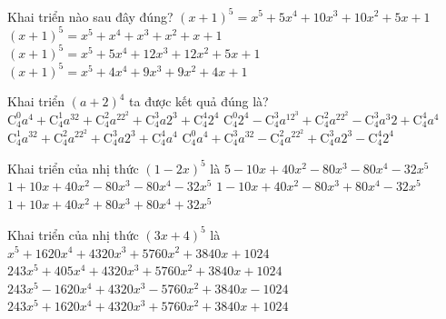 \begin{ex}%
	Khai triển nào sau đây  đúng?
	\choice 
		 {\True $(x+1)^5=x^5+5x^4+10x^3+10x^2+5x+1$}
		{$(x+1)^5=x^5+x^4+x^3+x^2+x+1$} 
		{$(x+1)^5=x^5+5x^4+12x^3+12x^2+5x+1$} 
		 {$(x+1)^5=x^5+4x^4+9x^3+9x^2+4x+1$}
\end{ex}

\begin{ex}%
	Khai triển $(a + 2)^4$ ta  được kết quả đúng là?
	 \choice
		{\True $\mathrm{C}_{4}^{0}a^4 + \mathrm{C}_{4}^{1}a^32 + \mathrm{C}_{4}^{2}a^22^2 + \mathrm{C}_{4}^{3}a 2^3 +  \mathrm{C}_{4}^{4}2^4$}
		{$\mathrm{C}_{4}^{0}2^4  - \mathrm{C}_{4}^{3}a^12^3 + \mathrm{C}_{4}^{2}a^22^2 - \mathrm{C}_{4}^{3}a^3 2 + \mathrm{C}_{4}^{4}a^4$}
		 {$\mathrm{C}_{4}^{1}a^32 + \mathrm{C}_{4}^{2}a^22^2 + \mathrm{C}_{4}^{3}a2^3 + \mathrm{C}_{4}^{4}a^4$}
		{$\mathrm{C}_{4}^{0}a^4 +  \mathrm{C}_{4}^{3}a^32 - \mathrm{C}_{4}^{2}a^22^2 + \mathrm{C}_{4}^{3}a 2^3 - \mathrm{C}_{4}^{4}2^4$}
\end{ex}

\begin{ex}%
	Khai triển của nhị thức $(1-2x)^5$ là 
	\choice 
		 {$5-10x+40x^2-80x^3-80x^4-32x^5$}
		 {$1+10x+40x^2-80x^3-80x^4-32x^5$}
		{\True  $1-10x+40x^2-80x^3+80x^4-32x^5$}
		 {$1+10x+40x^2+80x^3+80x^4+32x^5$}
\end{ex}

\begin{ex}%
	Khai triển của nhị thức $(3x+4)^5$ là 
	 \choice
		 {$x^5+1620x^4+4320x^3+5760x^2+3840x+1024$}
		{$243x^5+405x^4+4320x^3+5760x^2+3840x+1024$} 
		{$243x^5-1620x^4+4320x^3-5760x^2+3840x-1024$} 
		 {\True $243x^5+1620x^4+4320x^3+5760x^2+3840x+1024$}
\end{ex}

